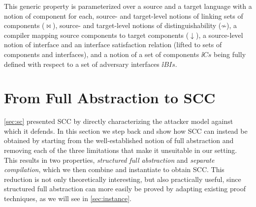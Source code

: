 \documentclass[10pt, conference, compsocconf, letterpaper, times]{IEEEtran}
\begin{document}
This generic property is parameterized over
  a source and a target language with a notion of component for each,
  source- and target-level notions of linking sets of components ($\bowtie$),
  source- and target-level notions of distinguishability ($\not\sim$),
  a compiler mapping source components to target components ($\downarrow$),
  a source-level notion of interface and an interface satisfaction relation
  (lifted
to sets of components and interfaces), and
  a notion of a set of components $\ii{Cs}$ being
  fully defined with respect to a set of adversary interfaces $\ii{BIs}$.

\section{From Full Abstraction to SCC}
\label{sec:fa-not-enough}

\ifsooner
{}
\fi

\autoref{sec:sc} presented SCC by directly
characterizing the attacker model against which it defends.
In this section we step back and show how SCC can instead be obtained by
starting from the well-established notion of full abstraction and
removing each of the three limitations that make it unsuitable
in our setting.
This results in two properties, {\em structured full abstraction} and {\em
  separate compilation}, which we then combine and instantiate to obtain SCC.
This reduction is
not only theoretically interesting, but also practically useful,
since structured full abstraction can more easily be proved by adapting
existing proof techniques, as we will see in \autoref{sec:instance}.



\ifsooner
{}
\fi
\end{document}
